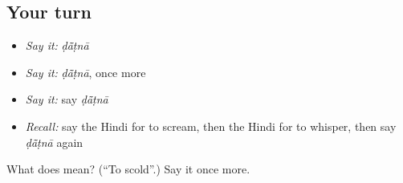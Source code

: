 \subsection*{Your turn}
\begin{itemize}
\raggedright
  \item \emph{Say it:} \emph{ḍā̃ṭnā}
  \item \emph{Say it:} \emph{ḍā̃ṭnā}, once more
  \item \emph{Say it:} say \emph{ḍā̃ṭnā}
  \item \emph{Recall:} say the Hindi for to scream, then the Hindi for to whisper, then say \emph{ḍā̃ṭnā} again
\end{itemize}

\begin{tcolorbox}[breakable,colback=teal!4,colframe=teal!35!black,title={Before you move on}]
What does  mean? (\textquotedblleft{}To scold\textquotedblright{}.) Say it once more.
\end{tcolorbox}
